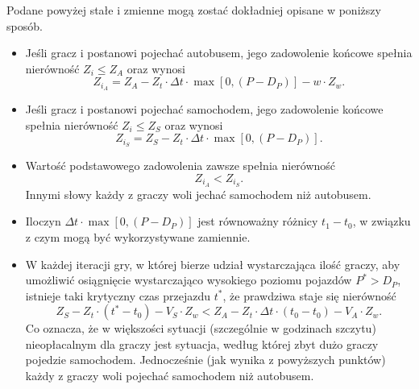\documentclass[12pt,a4paper]{article}
\begin{document}
Podane powyżej stałe i zmienne mogą zostać dokładniej opisane w poniższy sposób.
\begin{itemize}
	\item
	Jeśli gracz i postanowi pojechać autobusem, jego zadowolenie końcowe spełnia nierówność $Z_i \leq Z_A$ oraz wynosi
	\begin{equation}
	Z_{i_A} = Z_A - Z_t \cdot \Delta{t} \cdot \max[0, (P - D_{P})] - w \cdot Z_w.
	\end{equation}

	\item
	Jeśli gracz i postanowi pojechać samochodem, jego zadowolenie końcowe spełnia nierówność $Z_i \leq Z_S$ oraz wynosi
	\begin{equation}
	Z_{i_S} = Z_S - Z_t \cdot \Delta{t} \cdot \max[0, (P - D_{P})].
	\end{equation}
	
	\item
	Wartość podstawowego zadowolenia zawsze spełnia nierówność 
	\begin{equation}\label{porownanie}
	 Z_{i_A} < Z_{i_S}.
	 \end{equation}
	 Innymi słowy każdy z graczy woli jechać samochodem niż autobusem.
	
	\item
	Iloczyn $\Delta{t} \cdot \max[0, (P - D_{P})]$ jest równoważny różnicy $t_1 - t_0$, w związku z czym mogą być wykorzystywane zamiennie.
	
	\item
	W każdej iteracji gry, w której bierze udział wystarczająca ilość graczy, aby umożliwić osiągnięcie wystarczająco wysokiego poziomu pojazdów $P^* > D_P$, istnieje taki krytyczny 
	czas przejazdu $t^*$, że prawdziwa staje się nierówność
	\begin{equation}
	Z_S - Z_t \cdot (t^* - t_0) - V_S \cdot Z_w < Z_A - Z_t \cdot \Delta{t} \cdot (t_0 - t_0) - V_A \cdot Z_w.
	\end{equation} 
	Co oznacza, że w większości sytuacji (szczególnie w godzinach szczytu) nieopłacalnym dla graczy jest sytuacja, według której zbyt dużo graczy pojedzie samochodem. Jednocześnie 
	(jak wynika z powyższych punktów) każdy z graczy woli pojechać samochodem niż autobusem.
	
\end{itemize}
\end{document}
